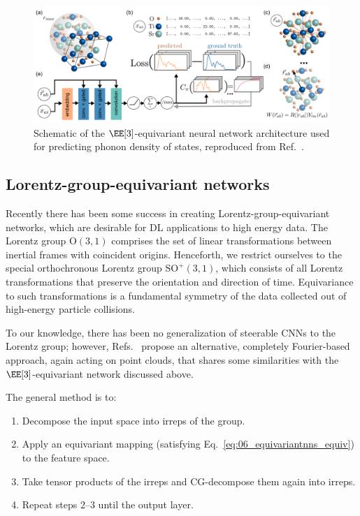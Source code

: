 \begin{figure}[ht]
    \centering
    \includegraphics[width=\textwidth]{figures/06-ML4Jets/equivariantnns/dos}
    \caption{Schematic of the $\EE[3]$-equivariant neural network architecture used for predicting phonon density of states, reproduced from Ref.~\cite{chen2020direct}.}
    \label{fig:06_equivariantnns_dos}
\end{figure}


\subsection{Lorentz-group-equivariant networks}
\label{sec:06_equivariantnns_lorentz}

Recently there has been some success in creating Lorentz-group-equivariant networks, which are desirable for DL applications to high energy data.
The Lorentz group $\mathrm{O}(3, 1)$ comprises the set of linear transformations between inertial frames with coincident origins.
Henceforth, we restrict ourselves to the special orthochronous Lorentz group $\mathrm{SO}^+(3, 1)$, which consists of all Lorentz transformations that preserve the orientation and direction of time.
Equivariance to such transformations is a fundamental symmetry of the data collected out of high-energy particle collisions.

To our knowledge, there has been no generalization of steerable CNNs to the Lorentz group; however, Refs.~\cite{equivariance-Fourier-Kondor,equivariance-Fourier-Anderson,E(2)-Equivariant, bogatskiy2020lorentz} propose an alternative, completely Fourier-based approach, again acting on point clouds, that shares some similarities with the $\EE[3]$-equivariant network discussed above.

The general method is to:

\begin{enumerate}
    \item Decompose the input space into irreps of the group.
    \item Apply an equivariant mapping (satisfying Eq.~\ref{eq:06_equivariantnns_equiv}) to the feature space.
    \item Take tensor products of the irreps and CG-decompose them again into irreps.
    \item Repeat steps 2--3 until the output layer.
\end{enumerate}

